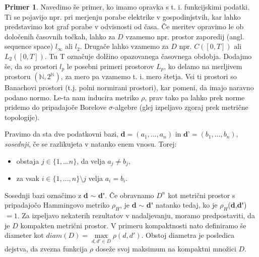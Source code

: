 \documentclass[12pt,a4paper]{amsart}
\theoremstyle{definition} %
\newtheorem{primer}[definicija]{Primer}
\theoremstyle{plain} %
\begin{document}
\begin{primer}
Navedimo še primer, ko imamo opravka s t. i. funkcijskimi podatki. Ti se pojavijo npr. pri merjenju porabe elektrike v gospodinjstvih, kar lahko predstavimo kot graf porabe v odvisnosti od časa. Če meritev opravimo le ob določenih časovnih točkah, lahko za $D$ vzamemo npr. prostor zaporedij (angl. sequence space) $l_{\infty}$ ali $l_{2}$. Drugače lahko vzamemo za $D$ npr. $C([0,T])$ ali $L_{2}([0,T])$. Tu T označuje dolžino opazovanega časovnega obdobja. Dodajmo še, da so prostori $l_p$ le posebni primeri prostorov $L_p$, ko delamo na merljivem prostoru $(\mathbb{N}, 2^\mathbb{N})$, za mero pa vzamemo t. i. mero štetja. Vsi ti prostori so Banachovi prostori (t.j. polni normirani prostori), kar pomeni, da imajo naravno podano normo. Le-ta nam inducira metriko $\rho$, prav tako pa lahko prek norme pridemo do pripadajoče Borelove $\sigma$-algebre (glej izpeljavo zgoraj prek metrične topologije). 
\end{primer}
\newline
\newline
Pravimo da sta dve podatkovni bazi, \textbf{d}$= (a_{1},...,a_{n})$ in $\textbf{d'}= (b_{1},...,b_{n})$,  \textit{sosednji}, če se razlikujeta v natanko enem vnosu. Torej:
\begin{itemize}
\item obstaja $j\in\{1,...n\}$, da velja $a_{j} \neq b_{j}$,
\item za vsak $i\in\{1,...,n\} \setminus j$ velja $a_{i} = b_{i}$.
\end{itemize}
Sosednji bazi označimo z \textbf{d} $\sim$ \textbf{d\'}. Če obravnamo $D^n$ kot metrični prostor s pripadajočo Hammingovo metriko $\rho_{H}$, je \textbf{d} $\sim$ \textbf{d\'} natanko tedaj, ko je $\rho_{H}$(\textbf{d},\textbf{d\'})$=1$.
\newline
\newline
Za izpeljavo nekaterih rezultatov v nadaljevanju, moramo predpostaviti, da je $D$ kompakten metrični prostor. V primeru kompaktnosti nato definiramo še diameter kot $diam(D) = \max\limits_{d,d' \in D}\rho(d,d')$. Obstoj diametra je posledica dejstva, da zvezna funkcija $\rho$ doseže svoj maksimum na kompaktni množici $D$.
\end{document}
